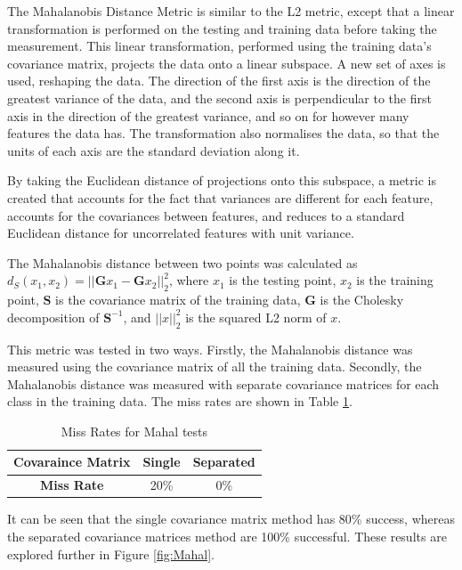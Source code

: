 \documentclass[10pt,twocolumn,letterpaper]{article}
\begin{document}
The Mahalanobis Distance Metric is similar to the L2 metric, except that a linear transformation is performed on the testing and training data before taking the measurement. This linear transformation, performed using the training data's covariance matrix, projects the data onto a linear subspace. A new set of axes is used, reshaping the data. The direction of the first axis is the direction of the greatest variance of the data, and the second axis is perpendicular to the first axis in the direction of the greatest variance, and so on for however many features the data has. The transformation also normalises the data, so that the units of each axis are the standard deviation along it. 

By taking the Euclidean distance of projections onto this subspace, a metric is created that accounts for the fact that variances are different for each feature, accounts for the covariances between features, and reduces to a standard Euclidean distance for uncorrelated features with unit variance.

The Mahalanobis distance between two points was calculated as $d_S(x_1,x_2) = ||\mathbf{G}x_1 - \mathbf{G}x_2||^2_2$, where $x_1$ is the testing point, $x_2$ is the training point, $\mathbf{S}$ is the covariance matrix of the training data, $\mathbf{G}$ is the Cholesky decomposition of $\mathbf{S}^{-1}$, and $||x||^2_2$ is the squared L2 norm of $x$.

This metric was tested in two ways. Firstly, the Mahalanobis distance was measured using the covariance matrix of all the training data. Secondly, the Mahalanobis distance was measured with separate covariance matrices for each class in the training data. The miss rates are shown in Table \ref{tab:MissMahal}. 

\begin{table}[H]
\caption{Miss Rates for Mahal tests \label{tab:MissMahal}}
\footnotesize
\begin{center}
\begin{tabular}{|c| c c|}
\hline
\bf Covaraince Matrix & Single & Separated \\ [0.5ex]
\hline
\bf Miss Rate & 20\% & 0\% \\ [0.5ex]
\hline
\end{tabular}
\end{center}
\end{table}

It can be seen that the single covariance matrix method has 80\% success, whereas the separated covariance matrices method are 100\% successful. These results are explored further in Figure \ref{fig:Mahal}.
\end{document}
